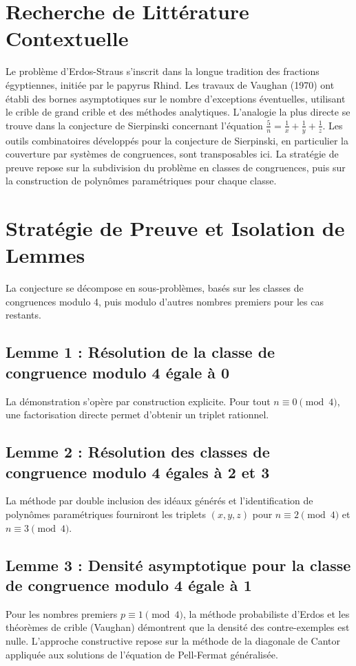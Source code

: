 \documentclass[11pt,a4paper]{article}
\begin{document}
\section{Recherche de Littérature Contextuelle}

Le problème d'Erdos-Straus s'inscrit dans la longue tradition des fractions égyptiennes, initiée par le papyrus Rhind. Les travaux de Vaughan (1970) ont établi des bornes asymptotiques sur le nombre d'exceptions éventuelles, utilisant le crible de grand crible et des méthodes analytiques. L'analogie la plus directe se trouve dans la conjecture de Sierpinski concernant l'équation $\frac{5}{n} = \frac{1}{x} + \frac{1}{y} + \frac{1}{z}$. Les outils combinatoires développés pour la conjecture de Sierpinski, en particulier la couverture par systèmes de congruences, sont transposables ici. La stratégie de preuve repose sur la subdivision du problème en classes de congruences, puis sur la construction de polynômes paramétriques pour chaque classe.

\section{Stratégie de Preuve et Isolation de Lemmes}

La conjecture se décompose en sous-problèmes, basés sur les classes de congruences modulo 4, puis modulo d'autres nombres premiers pour les cas restants.

\subsection{Lemme 1 : Résolution de la classe de congruence modulo 4 égale à 0}
La démonstration s'opère par construction explicite. Pour tout $n \equiv 0 \pmod 4$, une factorisation directe permet d'obtenir un triplet rationnel.

\subsection{Lemme 2 : Résolution des classes de congruence modulo 4 égales à 2 et 3}
La méthode par double inclusion des idéaux générés et l'identification de polynômes paramétriques fourniront les triplets $(x, y, z)$ pour $n \equiv 2 \pmod 4$ et $n \equiv 3 \pmod 4$.

\subsection{Lemme 3 : Densité asymptotique pour la classe de congruence modulo 4 égale à 1}
Pour les nombres premiers $p \equiv 1 \pmod 4$, la méthode probabiliste d'Erdos et les théorèmes de crible (Vaughan) démontrent que la densité des contre-exemples est nulle. L'approche constructive repose sur la méthode de la diagonale de Cantor appliquée aux solutions de l'équation de Pell-Fermat généralisée.
\end{document}
